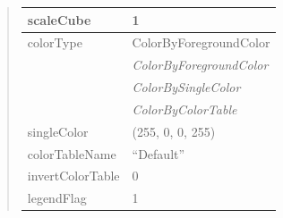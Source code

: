 \documentclass[letterpaper,10pt,english]{sphinxmanual}
\begin{document}
\begin{quote}
\begin{longtable}{|l|l|}
scaleCube
 & 
1
\\
\hline
colorType
 & 
ColorByForegroundColor
\\
\hline & 
\emph{ColorByForegroundColor}
\\
\hline & 
\emph{ColorBySingleColor}
\\
\hline & 
\emph{ColorByColorTable}
\\
\hline
singleColor
 & 
(255, 0, 0, 255)
\\
\hline
colorTableName
 & 
``Default''
\\
\hline
invertColorTable
 & 
0
\\
\hline
legendFlag
 & 
1
\\
\hline\end{longtable}

\end{quote}

\begin{DUlineblock}{0em}
\item[] 
\end{DUlineblock}

\begin{DUlineblock}{0em}
\item[] 
\end{DUlineblock}
\end{document}
